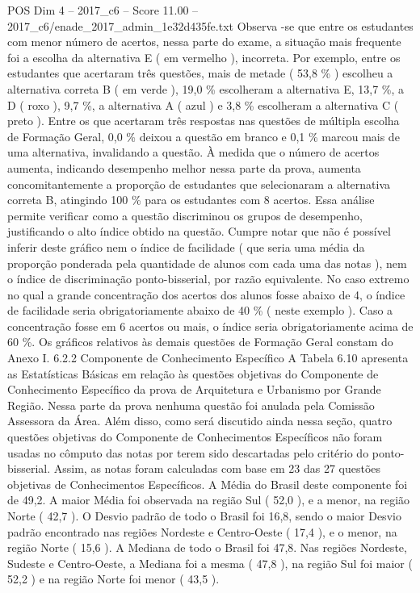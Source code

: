 \begin{textsample}{POS Dim 4 – 2017\_c6 – Score 11.00 – 2017\_c6/enade\_2017\_admin\_1e32d435fe.txt}
Observa -se que entre os estudantes com menor número de acertos, nessa parte do exame, a situação mais frequente foi a escolha da alternativa E ( em vermelho ), incorreta.
Por exemplo, entre os estudantes que acertaram três questões, mais de metade ( 53,8 \% ) escolheu a alternativa correta B ( em verde ), 19,0 \% escolheram a alternativa E, 13,7 \%, a D ( roxo ), 9,7 \%, a alternativa A ( azul ) e 3,8 \% escolheram a alternativa C ( preto ).
Entre os que acertaram três respostas nas questões de múltipla escolha de Formação Geral, 0,0 \% deixou a questão em branco e 0,1 \% marcou mais de uma alternativa, invalidando a questão.
À medida que o número de acertos aumenta, indicando desempenho melhor nessa parte da prova, aumenta concomitantemente a proporção de estudantes que selecionaram a alternativa correta B, atingindo 100 \% para os estudantes com 8 acertos.
Essa análise permite verificar como a questão discriminou os grupos de desempenho, justificando o alto índice obtido na questão.
Cumpre notar que não é possível inferir deste gráfico nem o índice de facilidade ( que seria uma média da proporção ponderada pela quantidade de alunos com cada uma das notas ), nem o índice de discriminação ponto-bisserial, por razão equivalente.
No caso extremo no qual a grande concentração dos acertos dos alunos fosse abaixo de 4, o índice de facilidade seria obrigatoriamente abaixo de 40 \% ( neste exemplo ).
Caso a concentração fosse em 6 acertos ou mais, o índice seria obrigatoriamente acima de 60 \%.
Os gráficos relativos às demais questões de Formação Geral constam do Anexo I. 6.2.2 Componente de Conhecimento Específico A Tabela 6.10 apresenta as Estatísticas Básicas em relação às questões objetivas do Componente de Conhecimento Específico da prova de Arquitetura e Urbanismo por Grande Região.
Nessa parte da prova nenhuma questão foi anulada pela Comissão Assessora da Área.
Além disso, como será discutido ainda nessa seção, quatro questões objetivas do Componente de Conhecimentos Específicos não foram usadas no cômputo das notas por terem sido descartadas pelo critério do ponto-bisserial.
Assim, as notas foram calculadas com base em 23 das 27 questões objetivas de Conhecimentos Específicos.
A Média do Brasil deste componente foi de 49,2.
A maior Média foi observada na região Sul ( 52,0 ), e a menor, na região Norte ( 42,7 ).
O Desvio padrão de todo o Brasil foi 16,8, sendo o maior Desvio padrão encontrado nas regiões Nordeste e Centro-Oeste ( 17,4 ), e o menor, na região Norte ( 15,6 ).
A Mediana de todo o Brasil foi 47,8.
Nas regiões Nordeste, Sudeste e Centro-Oeste, a Mediana foi a mesma ( 47,8 ), na região Sul foi maior ( 52,2 ) e na região Norte foi menor ( 43,5 ).

\end{textsample}
